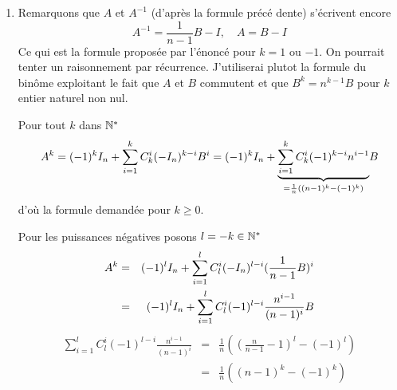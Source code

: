 \begin{enumerate}
\item  Remarquons que $A$ et $A^{-1}$ (d'apr{\`e}s la formule pr{\'e}c{\'e}%
dente) s'{\'e}crivent encore
\[
A^{-1}=\frac{1}{n-1}B-I,\quad A=B-I
\]
Ce qui est la formule propos{\'e}e par l'{\'e}nonc{\'e} pour $k=1$
ou $-1$. On pourrait tenter un raisonnement par r{\'e}currence.
J'utiliserai plutot la
formule du bin{\^o}me exploitant le fait que $A$ et $B$ commutent et que $%
B^{k}=n^{k-1}B$ pour $k$ entier naturel non nul.

Pour tout $k$ dans $\Bbb{N}^{*}$%
\[
A^{k}=(-1)^{k}I_{n}+\sum_{i=1}^{k}C_{k}^{i}(-I_{n})^{k-i}B^{i}=(-1)^{k}I_{n}+%
\underset{=\frac{1}{n}\left( (n-1)^{k}-(-1)^{k}\right) }{\underbrace{%
\sum_{i=1}^{k}C_{k}^{i}(-1)^{k-i}n^{i-1}}}B
\]
d'o{\`u} la formule demand{\'e}e pour $k\geq 0$.

Pour les puissances n{\'e}gatives posons $l=-k\in \Bbb{N}^{*}$%
\begin{eqnarray*}
A^{k}
&=&(-1)^{l}I_{n}+\sum_{i=1}^{l}C_{l}^{i}(-I_{n})^{l-i}(\frac{1}{n-1}B)^{i}\\
&=&(-1)^{l}I_{n}+\sum_{i=1}^{l}C_{l}^{i}(-1)^{l-i}\frac{n^{i-1}}{%
(n-1)^{i}}B
\end{eqnarray*}
\begin{eqnarray*}
\sum_{i=1}^{l}C_{l}^{i}(-1)^{l-i}\frac{n^{i-1}}{(n-1)^{i}}
 &=&\frac{1}{n}%
\left( (\frac{n}{n-1}-1)^{l}-(-1)^{l}\right)\\
&=&\frac{1}{n}\left( (n-1)^{k}-(-1)^{k}\right)
\end{eqnarray*}
\end{enumerate}
